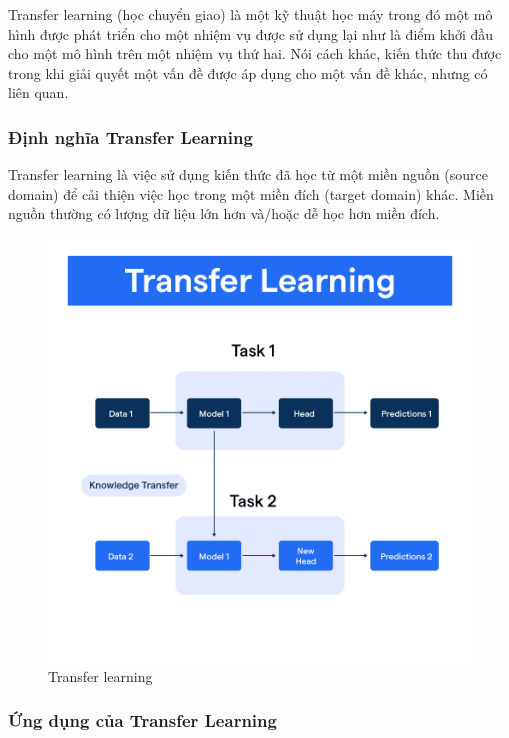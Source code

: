 Transfer learning (học chuyển giao) là một kỹ thuật học máy trong đó một mô hình được phát triển cho một nhiệm vụ được sử dụng lại như là điểm khởi đầu cho một mô hình trên một nhiệm vụ thứ hai. Nói cách khác, kiến thức thu được trong khi giải quyết một vấn đề được áp dụng cho một vấn đề khác, nhưng có liên quan. 

\subsubsection{Định nghĩa Transfer Learning}

Transfer learning là việc sử dụng kiến thức đã học từ một miền nguồn (source domain) để cải thiện việc học trong một miền đích (target domain) khác. Miền nguồn thường có lượng dữ liệu lớn hơn và/hoặc dễ học hơn miền đích. 

 \begin{figure}[H]
    \centering
    \includegraphics[width=14cm]{Images/Theoretical basis/Transfer_Learning.png}
\caption{Transfer learning}
\end{figure}


\subsubsection{Ứng dụng của Transfer Learning}

